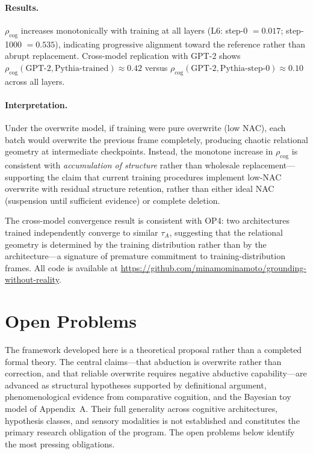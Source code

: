 \documentclass[12pt]{article}
\begin{document}
\paragraph{Results.}
$\rho_\mathrm{cog}$ increases monotonically with training
at all layers (L6: step-0 $= 0.017$; step-1000 $= 0.535$),
indicating progressive alignment toward the reference
rather than abrupt replacement.
Cross-model replication with GPT-2 \cite{radford2019language}
shows $\rho_\mathrm{cog}(\text{GPT-2}, \text{Pythia-trained})
\approx 0.42$ versus $\rho_\mathrm{cog}(\text{GPT-2},
\text{Pythia-step-0}) \approx 0.10$ across all layers.

\paragraph{Interpretation.}
Under the overwrite model, if training were pure overwrite
(low NAC), each batch would overwrite the previous frame
completely, producing chaotic relational geometry at
intermediate checkpoints.
Instead, the monotone increase in $\rho_\mathrm{cog}$ is
consistent with \emph{accumulation of structure} rather
than wholesale replacement---supporting the claim that
current training procedures implement low-NAC overwrite
with residual structure retention, rather than either
ideal NAC (suspension until sufficient evidence) or
complete deletion.

The cross-model convergence result is consistent with
OP4: two architectures trained independently converge
to similar $\tau_A$, suggesting that the relational
geometry is determined by the training distribution
rather than by the architecture---a signature of
premature commitment to training-distribution frames.
All code is available at
\url{https://github.com/minamominamoto/grounding-without-reality}.

\section{Open Problems}

The framework developed here is a theoretical proposal rather than a
completed formal theory. The central claims---that abduction is overwrite
rather than correction, and that reliable overwrite requires negative
abductive capability---are advanced as structural hypotheses supported
by definitional argument, phenomenological evidence from comparative
cognition, and the Bayesian toy model of Appendix~A. Their full
generality across cognitive architectures, hypothesis classes, and
sensory modalities is not established and constitutes the primary
research obligation of the program. The open problems below identify
the most pressing obligations.
\end{document}
